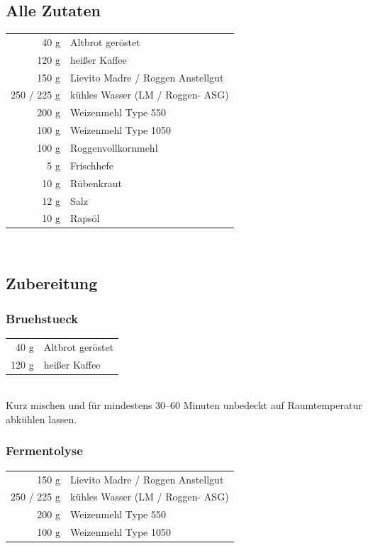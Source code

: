 \subsection*{Alle Zutaten}
\begin{tabular}{r l}
           40 g & Altbrot geröstet                  \\
          120 g & heißer Kaffee                     \\
          150 g & Lievito Madre / Roggen Anstellgut \\
    250 / 225 g & kühles Wasser (LM / Roggen- ASG)  \\
          200 g & Weizenmehl Type 550               \\
          100 g & Weizenmehl Type 1050              \\
          100 g & Roggenvollkornmehl                \\
            5 g & Frischhefe                        \\
           10 g & Rübenkraut                        \\
           12 g & Salz                              \\
           10 g & Rapsöl
\end{tabular}\\




\subsection*{Zubereitung}

\subsubsection*{\Gls{Bruehstueck}}
\begin{tabular}{r l}
    40 g & Altbrot geröstet\\
    120 g & heißer Kaffee\\
\end{tabular}\\

Kurz mischen und für mindestens 30–60 Minuten unbedeckt auf Raumtemperatur abkühlen lassen.

\subsubsection*{\Gls{Fermentolyse}}
\begin{tabular}{r l}
          150 g & Lievito Madre / Roggen Anstellgut \\
    250 / 225 g & kühles Wasser (LM / Roggen- ASG)  \\
          200 g & Weizenmehl Type 550               \\
          100 g & Weizenmehl Type 1050
\end{tabular}\\

